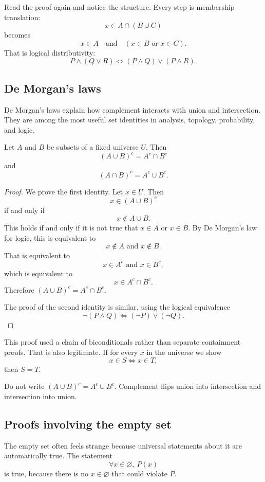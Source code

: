 Read the proof again and notice the structure. Every step is membership translation:
\[
x\in A\cap(B\cup C)
\]
becomes
\[
x\in A\quad\text{and}\quad (x\in B\text{ or }x\in C).
\]
That is logical distributivity:
\[
P\land(Q\lor R)\Longleftrightarrow(P\land Q)\lor(P\land R).
\]

\subsection{De Morgan's laws}

De Morgan's laws explain how complement interacts with union and intersection. They are among the most useful set identities in analysis, topology, probability, and logic.

\begin{theorem}
Let $A$ and $B$ be subsets of a fixed universe $U$. Then
\[
(A\cup B)^c=A^c\cap B^c
\]
and
\[
(A\cap B)^c=A^c\cup B^c.
\]
\end{theorem}

\begin{proof}
We prove the first identity. Let $x\in U$. Then
\[
x\in(A\cup B)^c
\]
if and only if
\[
x\notin A\cup B.
\]
This holds if and only if it is not true that $x\in A$ or $x\in B$. By De Morgan's law for logic, this is equivalent to
\[
x\notin A\text{ and }x\notin B.
\]
That is equivalent to
\[
x\in A^c\text{ and }x\in B^c,
\]
which is equivalent to
\[
x\in A^c\cap B^c.
\]
Therefore $(A\cup B)^c=A^c\cap B^c$.

The proof of the second identity is similar, using the logical equivalence
\[
\neg(P\land Q)\Longleftrightarrow(\neg P)\lor(\neg Q).
\]
\end{proof}

This proof used a chain of biconditionals rather than separate containment proofs. That is also legitimate. If for every $x$ in the universe we show
\[
x\in S\Longleftrightarrow x\in T,
\]
then $S=T$.

\begin{trapbox}
Do not write $(A\cup B)^c=A^c\cup B^c$. Complement flips union into intersection and intersection into union.
\end{trapbox}

\subsection{Proofs involving the empty set}

The empty set often feels strange because universal statements about it are automatically true. The statement
\[
\forall x\in\varnothing,\ P(x)
\]
is true, because there is no $x\in\varnothing$ that could violate $P$.

